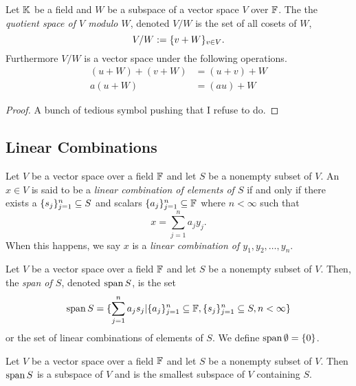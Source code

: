 \begin{definition}
	Let $\mathbb{K}$ be a field and $W$ be a subspace of a vector space $V$ over $\mathbb{F}$.
	The the \textit{quotient space of $V$ modulo $W$}, denoted $V/W$ is the set of all cosets of $W$,
	\[
		V/W := \lbrace v+W \rbrace_{v\in V}.
	\]
	Furthermore $V/W$ is a vector space under the following operations.
	\begin{align*}
		(u+W)+(v+W)&=(u+v)+W\\
		a(u+W)&=(au)+W
	\end{align*}
\end{definition}
\begin{proof}
	A bunch of tedious symbol pushing that I refuse to do.
\end{proof}

\pagebreak

\subsection{Linear Combinations}

\begin{definition}
	Let $V$ be a vector space over a field $\mathbb{F}$ and let $S$ be a nonempty subset of $V$.
	An $x\in V$ is said to be a \textit{linear combination of elements of $S$} if and only if there exists a $\lbrace s_j \rbrace_{j=1}^n\subseteq S$ and scalars $\lbrace a_j \rbrace_{j=1}^n\subseteq\mathbb{F}$ where $n < \infty$ such that
	\[
		x=\sum_{j=1}^n a_j y_j.
	\]
	When this happens, we say $x$ is a \textit{linear combination of $y_1,y_2,\ldots, y_n$}.
\end{definition}

\begin{definition}
	Let $V$ be a vector space over a field $\mathbb{F}$ and let $S$ be a nonempty subset of $V$.
	Then, the \textit{span of $S$}, denoted $\operatorname{span} S$, is the set
	\[
		\operatorname{span} S = \lbrace \sum_{j=1}^n a_j s_j | \lbrace a_j \rbrace_{j=1}^n\subseteq\mathbb{F}, \lbrace s_j \rbrace_{j=1}^n\subseteq S, n<\infty \rbrace
	\]
	or the set of linear combinations of elements of $S$.
	We define $\operatorname{span}\emptyset = \lbrace 0 \rbrace$.
\end{definition}

\begin{thm}\label{lincomb-min-ss}
	Let $V$ be a vector space over a field $\mathbb{F}$ and let $S$ be a nonempty subset of $V$.
	Then $\operatorname{span} S$ is a subspace of $V$ and is the smallest subspace of $V$ containing $S$.
\end{thm}

